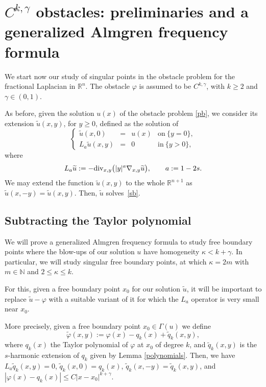 \documentclass[11pt]{amsart}
\theoremstyle{plain}
\numberwithin{equation}{section}
\begin{document}
\section{$C^{k,\gamma}$ obstacles: preliminaries and a generalized Almgren frequency formula}
\label{sec6}

We start now our study of singular points in the obstacle problem for the fractional Laplacian in ${\mathbb R}^n$.
The obstacle $\varphi$ is assumed to be $C^{k,\gamma}$, with $k\geq2$ and $\gamma\in(0,1)$.

As before, given the solution $u(x)$ of the obstacle problem \eqref{pb}, we consider its extension $\widetilde u(x,y)$, for $y\geq0$, defined as the solution of
\[\left\{ \begin{array}{rcll}
\widetilde{u}(x,0)&=&u(x) &\textrm{on}\ \{y=0\},\\
L_a \widetilde{u}(x,y)&=& 0&\textrm{in}\ \{y>0\},
\end{array}\right.\]
where
\begin{equation}\label{eq:La}
L_a\widetilde u:=-{{\rm div}}_{x,y}\bigl(|y|^{a}\nabla_{x,y}\widetilde u\bigr),\qquad a:=1-2s.
\end{equation}
We may extend the function $\widetilde u(x,y)$ to the whole ${\mathbb R}^{n+1}$ as $\widetilde u(x,-y)=\widetilde u(x,y)$.
Then, $\widetilde u$ solves~\eqref{sb}.


\subsection{Subtracting the Taylor polynomial}

We will prove a generalized Almgren frequency formula to study free boundary points where the blow-ups of our solution $u$ have homogeneity $\kappa<k+\gamma$.
In particular, we will study singular free boundary points, at which $\kappa=2m$ with $m\in\mathbb N$ and $2\leq \kappa\leq k$.

For this, given a free boundary point $x_0$ for our solution $\tilde u$, it will be important to replace $\widetilde u-\varphi$ with a suitable variant of it for which the $L_a$ operator is very small near $x_0$.

More precisely, given a free boundary point $x_0\in\Gamma(u)$ we define
\[\tilde \varphi(x,y):=\varphi(x)-q_k(x)+\tilde q_k(x,y),\]
where $q_k(x)$ the Taylor polynomial of $\varphi$ at $x_0$ of degree $k$, and $\tilde q_k(x,y)$ is the $s$-harmonic extension of $q_k$ given by Lemma \ref{polynomials}.
Then, we have $L_a \tilde q_k(x,y)=0$, $\tilde q_k(x,0)=q_k(x)$, $\tilde q_k(x,-y)=\tilde q_k(x,y)$, and $|\varphi(x)-q_k(x)|\leq C|x-x_0|^{k+\gamma}$.
\end{document}
